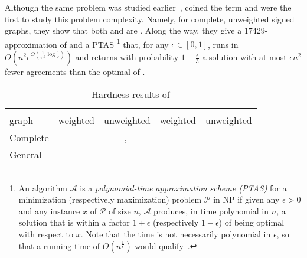 Although the same problem was studied earlier~\autocites{Early96}{Ben-Dor99}, \textcite{Bansal2002}
coined the term \pcc{} and were the first to study this problem complexity. Namely, for complete,
unweighted signed graphs, they show that both \mind{} and \maxa{} are \NPc{}. Along the way, they
give a $17429$-approximation of \mind{} and a PTAS%
\footnote{An algorithm $\mathcal{A}$ is a \emph{polynomial-time approximation scheme (PTAS)} for a
minimization (respectively maximization) problem $\mathcal{P}$  in NP if given any $\epsilon>0$ and
any instance $x$ of $\mathcal{P}$ of size $n$, $\mathcal{A}$ produces, in time polynomial in $n$, a
solution that is within a factor $1+\epsilon$ (respectively $1-\epsilon$) of being optimal with
respect to $x$. Note that the time is not necessarily polynomial in $\epsilon$, so that a running
time of $O(n^{\frac{1}{\epsilon}})$ would qualify~\autocite[Definition 3.10]{CpxBook99}.}
that, for any $\epsilon \in [0,1]$, runs in
$O(n^2e^{O(\frac{1}{\epsilon^{10}}\log\frac{1}{\epsilon})})$ and returns with probability
$1-\frac{\epsilon}{3}$ a solution with at most $\epsilon n^2$ fewer agreements than the optimal of
\maxa{}.

\begin{table}[bt]
   \centering
   \small
   \caption{Hardness results of \pcc{}} \label{tab:cc_cpx}
   \begin{tabulary}{187mm}{lCCCC}
      \toprule
               &    &                                    \\
      \cmidrule(r){2-3}
      \cmidrule(r){4-5}
      graph    & weighted                      & unweighted                                                     & weighted                                                     & unweighted                   \\
      \midrule
      Complete & \APXh{}~\autocite{Charikar2003} & \NPc{}~\autocite{Bansal2002}, \APXh{}~\autocite{Charikar2003}  &                                                              & \NPc{}~\autocite{Bansal2002} \\
      General  & \APXh{}~\autocites{Charikar2003}{Demaine2003} &  \APXh{}~\autocites{Charikar2003}{Emanuel2003}   &  \\
      \bottomrule
   \end{tabulary}
\end{table}

